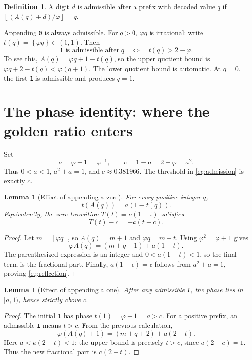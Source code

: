 \documentclass[11pt]{article}
\newtheorem{lemma}[theorem]{Lemma}
\theoremstyle{definition}\newtheorem{definition}[theorem]{Definition}
\newcommand{\ph}{\varphi}
\newcommand{\fl}[1]{\left\lfloor #1\right\rfloor}
\newcommand{\fr}[1]{\left\{#1\right\}}
\begin{document}
\begin{definition}
A digit $d$ is admissible after a prefix with decoded value $q$ if
$\fl{(A(q)+d)/\ph}=q$.
\end{definition}
Appending \texttt{0} is always admissible. For $q>0$, $\ph q$ is
irrational; write $t(q)=\fr{\ph q}\in(0,1)$. Then
\begin{equation}\label{eq:admission}
\texttt{1}\text{ is admissible after }q
\quad\Longleftrightarrow\quad t(q)>2-\ph.
\end{equation}
To see this, $A(q)=\ph q+1-t(q)$, so the upper quotient bound is
$\ph q+2-t(q)<\ph(q+1)$. The lower quotient bound is automatic.
At $q=0$, the first \texttt{1} is admissible and produces $q=1$.

\section{The phase identity: where the golden ratio enters}
Set
\[
a=\ph-1=\ph^{-1},\qquad c=1-a=2-\ph=a^2.
\]
Thus $0<a<1$, $a^2+a=1$, and $c\approx0.381966$.
The threshold in \eqref{eq:admission} is exactly $c$.

\begin{lemma}[Effect of appending a zero]\label{lem:zero}
For every positive integer $q$,
\[
t(A(q))=a(1-t(q)).
\]
Equivalently, the zero transition $T(t)=a(1-t)$ satisfies
\begin{equation}\label{eq:reflection}
T(t)-c=-a(t-c).
\end{equation}
\end{lemma}
\begin{proof}
Let $m=\fl{\ph q}$, so $A(q)=m+1$ and $\ph q=m+t$.
Using $\ph^2=\ph+1$ gives
\[
\ph A(q)=(m+q+1)+a(1-t).
\]
The parenthesized expression is an integer and $0<a(1-t)<1$,
so the final term is the fractional part. Finally,
$a(1-c)=c$ follows from $a^2+a=1$, proving
\eqref{eq:reflection}.
\end{proof}

\begin{lemma}[Effect of appending a one]\label{lem:one}
After any admissible \texttt{1}, the phase lies in $[a,1)$, hence
strictly above $c$.
\end{lemma}
\begin{proof}
The initial \texttt{1} has phase $t(1)=\ph-1=a>c$.
For a positive prefix, an admissible \texttt{1} means $t>c$.
From the previous calculation,
\[
\ph(A(q)+1)=(m+q+2)+a(2-t).
\]
Here $a<a(2-t)<1$: the upper bound is precisely $t>c$, since
$a(2-c)=1$. Thus the new fractional part is $a(2-t)$.
\end{proof}
\end{document}
